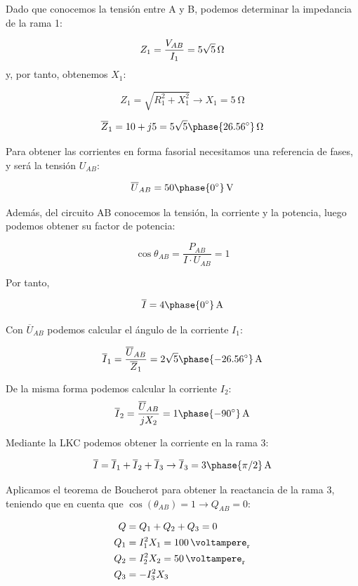 \documentclass[12pt]{article}
\begin{document}
Dado que conocemos la tensión entre A y B, podemos determinar la impedancia de la rama 1:

\[
  Z_1 = \frac{V_{AB}}{I_1} = \SI[parse-numbers=false]{5\sqrt{5}}{\ohm}
\]
y, por tanto, obtenemos $X_1$:

\[
  Z_1 = \sqrt{R_1^2 + X_1^2} \rightarrow X_1 = \SI{5}{\ohm}
\]

\[
  \overline{Z}_1 = 10 + j5 = \SI[parse-numbers=false]{5\sqrt{5}\phase{\ang{26.56}}}{\ohm} 
\]

Para obtener las corrientes en forma fasorial necesitamos una referencia de fases, y será la tensión $U_{AB}$:

\[
  \overline{U}_{AB} = \SI[parse-numbers=false]{50\phase{\ang{0}}}{\volt}
\]

Además, del circuito AB conocemos la tensión, la corriente y la potencia, luego podemos obtener su factor de potencia:

\[
  \cos\theta_{AB} = \frac{P_{AB}}{I \cdot U_{AB}} = 1
\]

Por tanto,

\[
  \overline{I} = \SI[parse-numbers=false]{4\phase{\ang{0}}}{\ampere}
\]


Con $\overline{U}_{AB}$ podemos calcular el ángulo de la corriente $I_1$:

\[
  \overline{I}_1 = \frac{\overline{U}_{AB}}{\overline{Z}_1} = \SI[parse-numbers=false]{2\sqrt{5}\phase{\ang{-26.56}}}{\ampere} 
\]

De la misma forma podemos calcular la corriente $I_2$:
\[
  \overline{I}_2 = \frac{\overline{U}_{AB}}{jX_2} = \SI[parse-numbers=false]{1\phase{\ang{-90}}}{\ampere} 
\]
  
Mediante la LKC podemos obtener la corriente en la rama 3:

\[
  \overline{I} = \overline{I}_1 + \overline{I}_2 + \overline{I}_3 \rightarrow \overline{I}_3 = \SI[parse-numbers=false]{3\phase{\pi/2}}{\ampere}
\]

Aplicamos el teorema de Boucherot para obtener la reactancia de la rama 3, teniendo que en cuenta que $\cos(\theta_{AB}) = 1 \rightarrow Q_{AB} = 0$:

\begin{align*}
  Q &= Q_1 + Q_2 + Q_3 = 0\\
  Q_1 &= I_1^2 X_1 = \SI{100}{\voltampere_r}\\
  Q_2 &= I_2^2 X_2 = \SI{50}{\voltampere_r}\\
  Q_3 &= - I_3^2 X_3
\end{align*}
\end{document}
